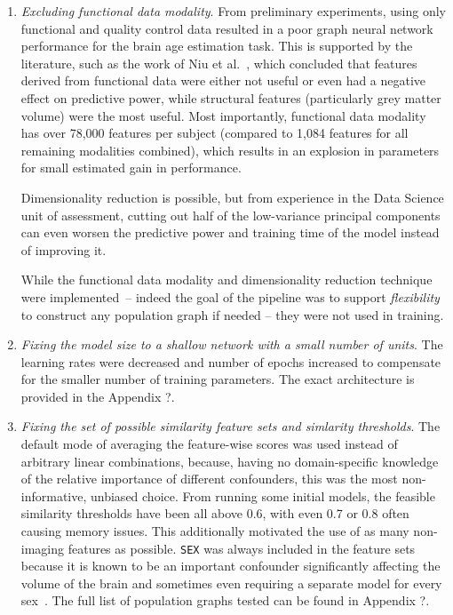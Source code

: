 \begin{enumerate}
    \item \textit{Excluding functional data modality}. From preliminary experiments, using only functional and quality control data resulted in a poor graph neural network performance for the brain age estimation task. This is supported by the literature, such as the work of Niu et al.~\cite{niu2019improved}, which concluded that features derived from functional data were either not useful or even had a negative effect on predictive power, while structural features (particularly grey matter volume) were the most useful. Most importantly, functional data modality has over 78,000 features per subject (compared to 1,084 features for all remaining modalities combined), which results in an explosion in parameters for small estimated gain in performance. 
    
    Dimensionality reduction is possible, but from experience in the Data Science unit of assessment, cutting out half of the low-variance principal components can even worsen the predictive power and training time of the model instead of improving it. 
    
    While the functional data modality and dimensionality reduction technique were implemented~– indeed the goal of the pipeline was to support \textit{flexibility} to construct any population graph if needed – they were not used in training.
    \item \textit{Fixing the model size to a shallow network with a small number of units}. The learning rates were decreased and number of epochs increased to compensate for the smaller number of training parameters. The exact architecture is provided in the Appendix ?.
    \item \textit{Fixing the set of possible similarity feature sets and simlarity thresholds}. The default mode of averaging the feature-wise scores was used instead of arbitrary linear combinations, because, having no domain-specific knowledge of the relative importance of different confounders, this was the most non-informative, unbiased choice. From running some initial models, the feasible similarity thresholds have been all above 0.6, with even 0.7 or 0.8 often causing memory issues. This additionally motivated the use of as many non-imaging features as possible. \texttt{SEX} was always included in the feature sets because it is known to be an important confounder significantly affecting the volume of the brain and sometimes even requiring a separate model for every sex~\cite{kaufmann2019}. The full list of population graphs tested can be found in Appendix ?.
\end{enumerate}

